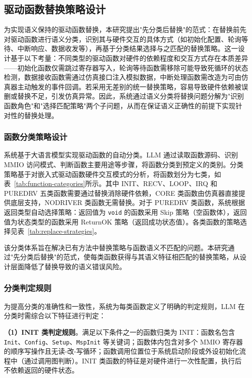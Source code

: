 \subsection{驱动函数替换策略设计}
\label{sec:driver-replacement-strategy}

为实现语义保持的驱动函数替换，本研究提出"先分类后替换"的范式：在替换前先对驱动函数进行语义分类，识别其与硬件交互的具体方式（如初始化配置、轮询等待、中断响应、数据收发等），再基于分类结果选择与之匹配的替换策略。这一设计基于以下考量：不同类型的驱动函数对硬件的依赖程度和交互方式存在本质差异——初始化函数仅需跳过寄存器写入，轮询等待函数需移除可能导致死循环的状态检测，数据接收函数需通过仿真接口注入模拟数据，中断处理函数需改造为可由仿真器主动触发的事件回调。若采用无差别的统一替换策略，容易导致硬件依赖被误删或替换不足，引发仿真异常。因此，系统通过语义分类将替换问题分解为"识别函数角色"和"选择匹配策略"两个子问题，从而在保证语义正确性的前提下实现针对性的替换处理。

\subsubsection{函数分类策略设计}

系统基于大语言模型实现驱动函数的自动分类。LLM 通过读取函数源码、识别 MMIO 访问模式、判断函数主要用途等步骤，将函数分类到预定义的类别。分类策略基于对嵌入式驱动函数硬件交互模式的分析，将函数划分为七类，如表~\ref{tab:function-categories}所示。其中 INIT、RECV、LOOP、IRQ 和 PUREDRV 五类函数需要通过替换消除硬件依赖，CORE 类函数由仿真器直接提供底层支持，NODRIVER 类函数无需替换。对于 PUREDRV 类函数，系统根据返回类型自动选择策略：返回值为 \texttt{void} 的函数采用 Skip 策略（空函数体），返回值为状态类型的函数采用 ReturnOK 策略（返回成功状态值）。各类函数的策略选择见表~\ref{tab:replace-strategies}。

该分类体系旨在解决已有方法中替换策略与函数语义不匹配的问题。本研究通过"先分类后替换"的范式，使每类函数获得与其语义特征相匹配的替换策略，从设计层面降低了替换导致的语义错误风险。

\subsubsection{分类判定规则}

为提高分类的准确性和一致性，系统为每类函数定义了明确的判定规则，LLM 在分类时需综合以下特征进行判定：

\textbf{（1）INIT 类判定规则}。满足以下条件之一的函数归类为 INIT：函数名包含 \texttt{Init}、\texttt{Config}、\texttt{Setup}、\texttt{MspInit} 等关键词；函数体内包含对多个 MMIO 寄存器的顺序写操作且无读-改-写循环；函数调用位置位于系统启动阶段或外设初始化流程中（通过调用图判断）。INIT 类函数的特征是对硬件进行一次性配置，执行后不依赖返回的硬件状态。

